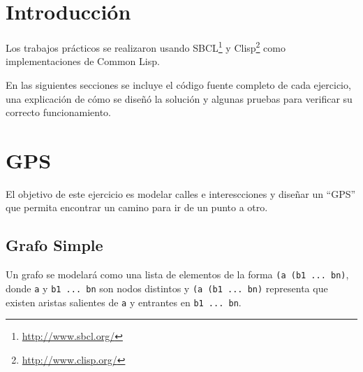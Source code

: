 \documentclass[12pt,titlepage]{article}
\begin{document}


\setcounter{page}{1}

\tableofcontents
\newpage



\clearpage	

\setlength{\parindent}{0pt}
\setlength{\parskip}{2ex plus 0.5ex minus 0.2ex}

\hypersetup{
linkcolor=red
}



\section{Introducción}

Los trabajos prácticos se realizaron usando SBCL\footnote{\url{http://www.sbcl.org/}} y Clisp\footnote{\url{http://www.clisp.org/}} como implementaciones de Common Lisp.

En las siguientes secciones se incluye el código fuente completo de cada ejercicio, una explicación de cómo se diseñó la solución y algunas pruebas para verificar su correcto funcionamiento.

\section{GPS}

El objetivo de este ejercicio es modelar calles e interescciones y diseñar un ``GPS'' que permita encontrar un camino para ir de un punto a otro.

\subsection{Grafo Simple}

Un grafo se modelará como una lista de elementos de la forma \lstinline|(a (b1 ... bn)|, donde \lstinline|a| y \lstinline|b1 ... bn| son nodos distintos y \lstinline|(a (b1 ... bn)| representa que existen aristas salientes de \lstinline|a| y entrantes en \lstinline|b1 ... bn|.
\end{document}
